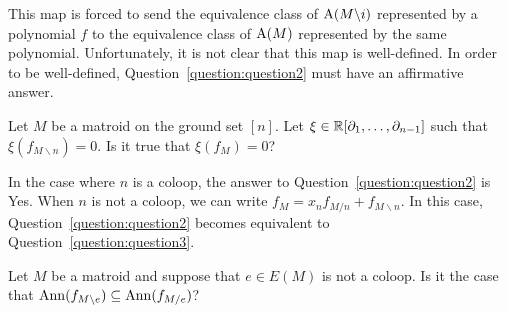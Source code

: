 \documentclass{puthesis-UG}
\begin{document}
This map is forced to send the equivalence class of $\operatorname{A}(M \backslash i)$ represented by a polynomial $f$ to the equivalence class of $\operatorname{A}(M)$ represented by the same polynomial. Unfortunately, it is not clear that this map is well-defined. In order to be well-defined, Question~\ref{question:question2} must have an affirmative answer. 

\begin{question} \label{question:question2}
	Let $M$ be a matroid on the ground set $[n]$. Let $\xi \in \mathbb{R}[\partial_1, \ldots, \partial_{n-1}]$ such that $\xi (f_{M \backslash n}) = 0$. Is it true that $\xi (f_M) = 0$? 
\end{question}

In the case where $n$ is a coloop, the answer to Question~\ref{question:question2} is Yes. When $n$ is not a coloop, we can write $f_M = x_n f_{M / n} + f_{M \backslash n}$. In this case, Question~\ref{question:question2} becomes equivalent to Question~\ref{question:question3}. 

\begin{question} \label{question:question3}
 	Let $M$ be a matroid and suppose that $e \in E(M)$ is not a coloop. Is it the case that $\operatorname{Ann} (f_{M \backslash e}) \subseteq \operatorname{Ann} (f_{M / e})$? 
\end{question}
\end{document}
